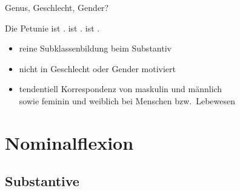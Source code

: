 \begin{frame}
  {Genus, Geschlecht, Gender?}
  \pause
  \begin{exe}
    \ex \label{ex:genus039}
    \begin{xlist}
      \ex \alert{Die Petunie} ist .
      \ex {} ist .
      \ex {} ist .
    \end{xlist}
  \end{exe}
  \pause
  \Halbzeile
  \begin{itemize}[<+->]
    \item reine Subklassenbildung beim Substantiv
    \item nicht in Geschlecht oder Gender motiviert
    \item tendentiell Korrespondenz von maskulin und männlich\\
      sowie feminin und weiblich bei Menschen bzw.\ Lebewesen
  \end{itemize}
\end{frame}

\section{Nominalflexion}

\subsection{Substantive}

